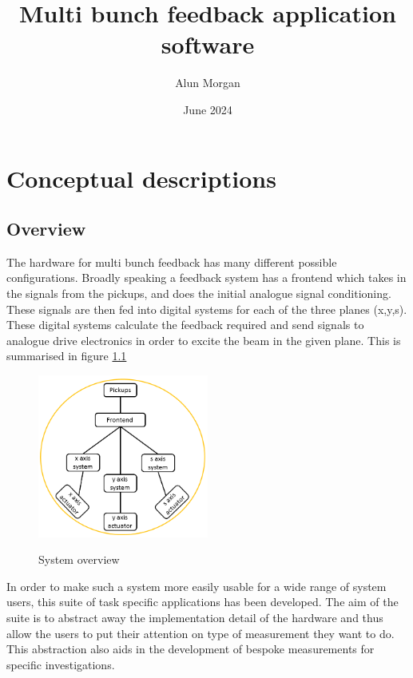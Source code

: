 \documentclass{report}
\newcommand{\docTitle}{Multi bunch feedback application software}
\begin{document}
\title{\docTitle}
\author{Alun Morgan}
\date{June 2024}

\maketitle

\tableofcontents
\clearpage
\chapter{Conceptual descriptions}
\section{Overview}
The hardware for multi bunch feedback has many different possible configurations. Broadly speaking a feedback system has a frontend which takes in the signals from the pickups, and does the initial analogue signal conditioning. These signals are then fed into digital systems for each of the three planes (x,y,s). These digital systems calculate the feedback required and send signals to analogue drive electronics in order to excite the beam in the given plane. This is summarised in figure \ref{system_overview}

\begin{figure}[hbt]
\begin{center}
  \includegraphics[width=0.5\textwidth]{top_level_system_overview.png}\\
  \caption{System overview}\label{system_overview}
\end{center}
\end{figure}

In order to make such a system more easily usable for a wide range of system users, this suite of task specific applications has been developed. The aim of the suite is to abstract away the implementation detail of the hardware and thus allow the users to put their attention on type of measurement they want to do. This abstraction also aids in the development of bespoke measurements for specific investigations.
\end{document}
